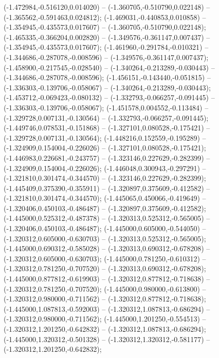  (-1.472984,-0.516120,0.014020) -- (-1.360705,-0.510790,0.022148) -- (-1.365562,-0.591463,0.024812);
 (-1.469031,-0.440853,0.010858) -- (-1.354945,-0.435573,0.017607) -- (-1.360705,-0.510790,0.022148);
 (-1.465335,-0.366204,0.002820) -- (-1.349576,-0.361147,0.007437) -- (-1.354945,-0.435573,0.017607);
 (-1.461960,-0.291784,-0.010321) -- (-1.344686,-0.287078,-0.008596) -- (-1.349576,-0.361147,0.007437);
 (-1.458900,-0.217545,-0.028540) -- (-1.340264,-0.213289,-0.030443) -- (-1.344686,-0.287078,-0.008596);
 (-1.456151,-0.143440,-0.051815) -- (-1.336303,-0.139706,-0.058067) -- (-1.340264,-0.213289,-0.030443);
 (-1.453712,-0.069423,-0.080132) -- (-1.332793,-0.066257,-0.091445) -- (-1.336303,-0.139706,-0.058067);
 (-1.451578,0.004552,-0.113484) -- (-1.329728,0.007131,-0.130564) -- (-1.332793,-0.066257,-0.091445);
 (-1.449746,0.078531,-0.151868) -- (-1.327101,0.080528,-0.175421) -- (-1.329728,0.007131,-0.130564);
 (-1.448216,0.152559,-0.195289) -- (-1.324909,0.154004,-0.226026) -- (-1.327101,0.080528,-0.175421);
 (-1.446983,0.226681,-0.243757) -- (-1.323146,0.227629,-0.282399) -- (-1.324909,0.154004,-0.226026);
 (-1.446048,0.300943,-0.297291) -- (-1.321810,0.301474,-0.344570) -- (-1.323146,0.227629,-0.282399);
 (-1.445409,0.375390,-0.355911) -- (-1.320897,0.375609,-0.412582) -- (-1.321810,0.301474,-0.344570);
 (-1.445065,0.450066,-0.419649) -- (-1.320406,0.450103,-0.486487) -- (-1.320897,0.375609,-0.412582);
 (-1.445000,0.525312,-0.487378) -- (-1.320313,0.525312,-0.565005) -- (-1.320406,0.450103,-0.486487);
 (-1.445000,0.605000,-0.544050) -- (-1.320312,0.605000,-0.630703) -- (-1.320313,0.525312,-0.565005);
 (-1.445000,0.690312,-0.585028) -- (-1.320313,0.690312,-0.678208) -- (-1.320312,0.605000,-0.630703);
 (-1.445000,0.781250,-0.610312) -- (-1.320312,0.781250,-0.707520) -- (-1.320313,0.690312,-0.678208);
 (-1.445000,0.877812,-0.619903) -- (-1.320312,0.877812,-0.718638) -- (-1.320312,0.781250,-0.707520);
 (-1.445000,0.980000,-0.613800) -- (-1.320312,0.980000,-0.711562) -- (-1.320312,0.877812,-0.718638);
 (-1.445000,1.087813,-0.592003) -- (-1.320312,1.087813,-0.686294) -- (-1.320312,0.980000,-0.711562);
 (-1.445000,1.201250,-0.554513) -- (-1.320312,1.201250,-0.642832) -- (-1.320312,1.087813,-0.686294);
 (-1.445000,1.320312,-0.501328) -- (-1.320312,1.320312,-0.581177) -- (-1.320312,1.201250,-0.642832);
